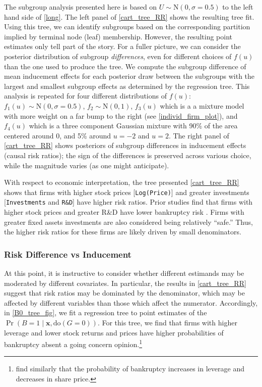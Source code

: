 \documentclass[aoas,preprint, 11pt, dvipsnames, table, x11name]{imsart}
\newcommand{\N}{\mbox{N}}
\renewcommand{\bm}[1]{\mathbf{#1}}
\theoremstyle{remark}
\begin{document}
	
	The subgroup analysis presented here is based on $U \sim \N(0, \sigma=0.5)$ to the left hand side of \autoref{long}. The left panel of \autoref{cart_tree_RR} shows the resulting tree fit. Using this tree, we can identify subgroups based on the corresponding partition implied by terminal node (leaf) membership. However, the resulting point estimates only tell part of the story. For a fuller picture, we can consider the posterior distribution of subgroup {\em differences}, even for different choices of $f(u)$ than the one used to produce the tree.  We compute the subgroup difference of mean inducement effects for each posterior draw between the subgroups with the largest and smallest subgroup effects as determined by the regression tree.  This analysis is repeated for four different distributions of $f(u)$: $f_1(u)\sim \N(0,\sigma=0.5)$, $f_2\sim \N(0,1)$, $f_3(u)$ which is a a mixture model with more weight on a far bump to the right (see \autoref{individ_firm_plot}), and $f_4(u)$ which is a three component Gaussian mixture with 90\% of the area centered around 0, and 5\% around $u=-2$ and $u=2$. The right panel of \autoref{cart_tree_RR} shows posteriors of subgroup differences in inducement effects (causal risk ratios); the sign of the differences is preserved across various choice, while the magnitude varies (as one might anticipate).
	
	With respect to economic interpretation, the tree presented \autoref{cart_tree_RR} shows that firms with higher stock prices [{\tt Log(Price)}] and greater investments [{\tt Investments} and {\tt R\&D}] have higher risk ratios. Prior studies find that firms with higher stock prices \citep{Campbell-Hilscher-Szilagyi-2008} and greater R\&D have lower bankruptcy risk \citep{JindalMcAlister-2015}. Firms with greater fixed assets investments are also considered being relatively ``safe.'' Thus, the higher risk ratios for these firms are likely driven by small denominators. 
	
	\subsubsection{Risk Difference vs Inducement}\label{sec:RDvsInd}
	At this point, it is instructive to consider whether different estimands may be moderated by different covariates. In particular, the results in \autoref{cart_tree_RR} suggest that risk ratios may be dominated by the denominator, which may be affected by different variables than those which affect the numerator. Accordingly, in \autoref{B0_tree_fig}, we fit a regression tree to point estimates of the $\Pr(B=1\mid \bm{x}, \text{do}(G=0))$. For this tree, we find that firms with higher leverage and lower stock returns and prices have higher probabilities of bankruptcy absent a going concern opinion.\footnote{\cite{Campbell-Hilscher-Szilagyi-2008} find similarly that the probability of bankruptcy increases in leverage and decreases in share price.}
	
\end{document}
